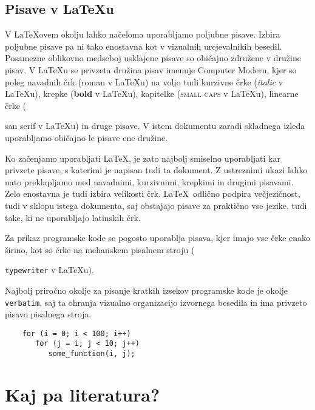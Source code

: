 \documentclass{feridiploma}
\begin{document}
	\section{Pisave v \LaTeX u}
	
	V  \LaTeX ovem okolju lahko načeloma uporabljamo poljubne pisave. 
	Izbira poljubne pisave pa ni tako enostavna kot v vizualnih urejevalnikih besedil.
	Posamezne oblikovno medseboj usklajene pisave so običajno združene v družine pisav.
	V \LaTeX u se privzeta družina pisav imenuje Computer Modern,
	kjer so poleg navadnih črk (roman v \LaTeX u) na voljo tudi kurzivne črke (\textit{italic} v \LaTeX u), 
	krepke (\textbf{bold} v \LaTeX u), kapitelke (\textsc{small caps} v \LaTeX u), linearne črke ({\textsf{san serif} v \LaTeX u)                                                                                                                                                                                                                                                                                                                         
	in druge pisave.
	V istem dokumentu zaradi skladnega izleda uporabljamo običajno le pisave ene družine. 
	
	Ko začenjamo uporabljati \LaTeX, je zato najbolj smiselno uporabljati kar privzete pisave, s katerimi je napisan tudi ta dokument.
	Z ustreznimi ukazi  lahko nato preklapljamo med navadnimi, kurzivnimi, krepkimi in drugimi pisavami. 
	Zelo enostavna je tudi izbira velikosti črk.
	\LaTeX\  odlično podpira večjezičnost, tudi v sklopu istega dokumenta, saj obstajajo pisave za praktično vse jezike, tudi take, ki ne uporabljajo latinskih črk.
	
	Za prikaz programske kode se pogosto uporablja pisava, kjer imajo vse črke enako širino, kot so  črke na mehanskem pisalnem stroju ({\texttt{typewriter} v \LaTeX u).
	
	Najbolj priročno okolje za pisanje kratkih izsekov programske kode je okolje \texttt{verbatim}, saj ta ohranja vizualno organizacijo izvornega besedila in ima privzeto pisavo pisalnega stroja.
	
	\begin{verbatim}
	for (i = 0; i < 100; i++)
	   for (j = i; j < 10; j++)
	      some_function(i, j);
	\end{verbatim}
	
	\chapter{Kaj pa literatura?}
	\label{lit}
	
}}
\end{document}
